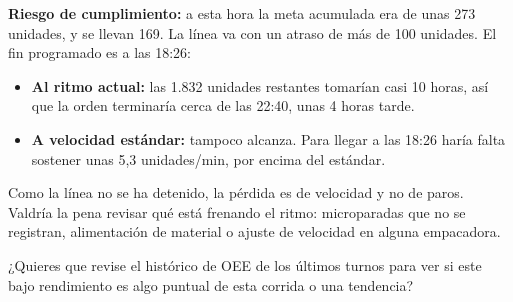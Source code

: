 \begin{singlespace}
{\textbf{Riesgo de cumplimiento:} a esta hora la meta acumulada era de unas 273 unidades, y se llevan 169. La línea va con un atraso de más de 100 unidades. El fin programado es a las 18:26:

\begin{itemize}[leftmargin=1.2em,itemsep=0pt,topsep=2pt]
\item \textbf{Al ritmo actual:} las 1.832 unidades restantes tomarían casi 10 horas, así que la orden terminaría cerca de las 22:40, unas 4 horas tarde.
\item \textbf{A velocidad estándar:} tampoco alcanza. Para llegar a las 18:26 haría falta sostener unas 5,3 unidades/min, por encima del estándar.
\end{itemize}



Como la línea no se ha detenido, la pérdida es de velocidad y no de paros. Valdría la pena revisar qué está frenando el ritmo: microparadas que no se registran, alimentación de material o ajuste de velocidad en alguna empacadora.



¿Quieres que revise el histórico de OEE de los últimos turnos para ver si este bajo rendimiento es algo puntual de esta corrida o una tendencia?}

\end{singlespace}

